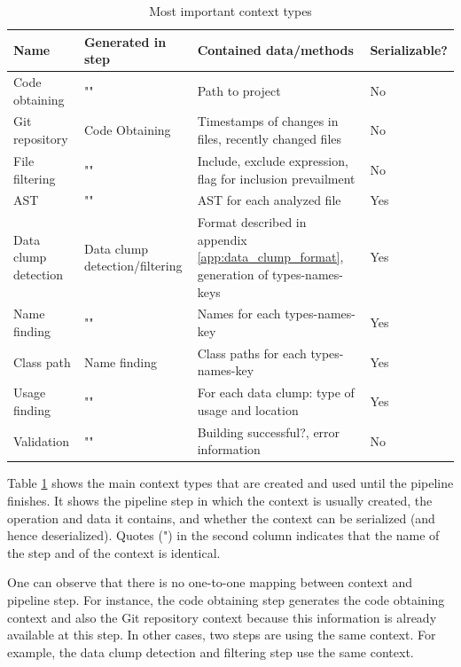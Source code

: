 \begin{table}[ht!]
    \centering
    \begin{tabular}{m{3cm}|m{2cm}|m{5cm}|m{2cm}}
        Name & Generated in step & Contained data/methods & Serializable?  \\\hline
        Code obtaining & "" & Path to project & No \\\hline
        Git repository & Code Obtaining & Timestamps of changes in files, recently changed files & No \\\hline
        File filtering & "" & Include, exclude expression, flag for inclusion prevailment & No \\\hline

        AST & "" & \ac{AST} for each analyzed file &  Yes \\\hline
         Data clump detection & Data clump detection/filtering  & Format described in appendix \ref{app:data_clump_format}, generation of types-names-keys & Yes \\\hline 
         Name finding & "" & Names for each types-names-key & Yes\\\hline

         Class path & Name finding & Class paths for each types-names-key & Yes\\\hline

         Usage finding & "" & For each data clump: type of usage and  location & Yes \\\hline

         Validation & "" & Building successful?, error information & No \\\hline
         
    \end{tabular}
    \caption{Most important context types}
    \label{tab:context_types}
\end{table}

Table \ref{tab:context_types} shows the main context types that are created and used until the pipeline finishes. It shows the pipeline step in which the context is usually created, the operation and data it contains, and whether the context can be serialized (and hence deserialized). Quotes (") in the second column indicates that the name of the step and of the context is identical. 

One can observe that there is no one-to-one mapping between context and pipeline step. For instance, the code obtaining step generates the code obtaining context and also the Git repository context because this information is already available at this step. In other cases, two steps are using the same context. For example, the data clump detection and filtering step use the same context.

